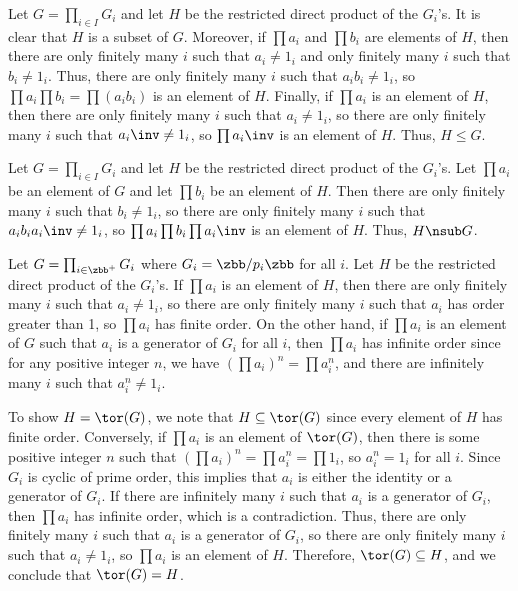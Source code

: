 \begin{solenum}
    \item Let $G = \prod_{i \in I} G_i$ and let $H$ be the restricted direct product of the $G_i$'s.
	It is clear that $H$ is a subset of $G$.
	Moreover, if $\prod a_i$ and $\prod b_i$ are elements of $H$, then there are only finitely many $i$ such that $a_i \neq 1_i$ and only finitely many $i$ such that $b_i \neq 1_i$.
	Thus, there are only finitely many $i$ such that $a_i b_i \neq 1_i$, so $\prod a_i \prod b_i = \prod (a_i b_i)$ is an element of $H$.
	Finally, if $\prod a_i$ is an element of $H$, then there are only finitely many $i$ such that $a_i \neq 1_i$, so there are only finitely many $i$ such that $a_i\inv \neq 1_i$, so $\prod a_i\inv$ is an element of $H$.
	Thus, $H \leq G$.
    \item Let $G = \prod_{i \in I} G_i$ and let $H$ be the restricted direct product of the $G_i$'s.
	Let $\prod a_i$ be an element of $G$ and let $\prod b_i$ be an element of $H$.
	Then there are only finitely many $i$ such that $b_i \neq 1_i$, so there are only finitely many $i$ such that $a_i b_i a_i\inv \neq 1_i$, so $\prod a_i \prod b_i \prod a_i\inv$ is an element of $H$.
	Thus, $H \nsub G$.
    \item Let $G = \prod_{i \in \zbb^+} G_i$ where $G_i = \zbb/p_i\zbb$ for all $i$.
	Let $H$ be the restricted direct product of the $G_i$'s.
	If $\prod a_i$ is an element of $H$, then there are only finitely many $i$ such that $a_i \neq 1_i$, so there are only finitely many $i$ such that $a_i$ has order greater than 1, so $\prod a_i$ has finite order.
	On the other hand, if $\prod a_i$ is an element of $G$ such that $a_i$ is a generator of $G_i$ for all $i$, then $\prod a_i$ has infinite order since for any positive integer $n$, we have $(\prod a_i)^n = \prod a_i^n$, and there are infinitely many $i$ such that $a_i^n \neq 1_i$.
    
    To show $H = \tor(G)$, we note that $H \subseteq \tor(G)$ since every element of $H$ has finite order.
	Conversely, if $\prod a_i$ is an element of $\tor(G)$, then there is some positive integer $n$ such that $(\prod a_i)^n = \prod a_i^n = \prod 1_i$, so $a_i^n = 1_i$ for all $i$.
	Since $G_i$ is cyclic of prime order, this implies that $a_i$ is either the identity or a generator of $G_i$.
	If there are infinitely many $i$ such that $a_i$ is a generator of $G_i$, then $\prod a_i$ has infinite order, which is a contradiction.
	Thus, there are only finitely many $i$ such that $a_i$ is a generator of $G_i$, so there are only finitely many $i$ such that $a_i \neq 1_i$, so $\prod a_i$ is an element of $H$.
	Therefore, $\tor(G) \subseteq H$, and we conclude that $\tor(G) = H$.
\end{solenum}

